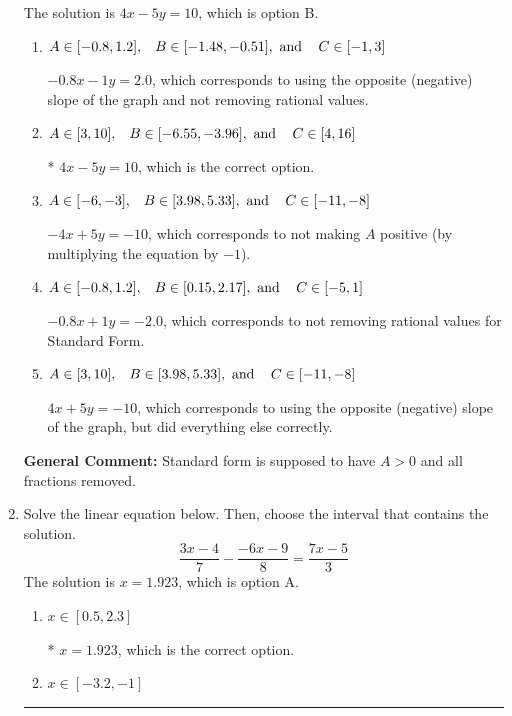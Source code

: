 \documentclass{extbook}[14pt]
\newcommand{\litem}[1]{\item #1

\rule{\textwidth}{0.4pt}}
\begin{document}
\begin{enumerate}
{The solution is \( 4x - 5y = 10 \), which is option B.\begin{enumerate}[label=\Alph*.]
\item \( A \in [-0.8, 1.2], \hspace{3mm} B \in [-1.48, -0.51], \text{ and } \hspace{3mm} C \in [-1, 3] \)

 $-0.8x - 1y = 2.0$, which corresponds to using the opposite (negative) slope of the graph and not removing rational values.
\item \( A \in [3, 10], \hspace{3mm} B \in [-6.55, -3.96], \text{ and } \hspace{3mm} C \in [4, 16] \)

* $4x - 5y = 10$, which is the correct option.
\item \( A \in [-6, -3], \hspace{3mm} B \in [3.98, 5.33], \text{ and } \hspace{3mm} C \in [-11, -8] \)

 $-4x + 5y = -10$, which corresponds to not making $A$ positive (by multiplying the equation by $-1$).
\item \( A \in [-0.8, 1.2], \hspace{3mm} B \in [0.15, 2.17], \text{ and } \hspace{3mm} C \in [-5, 1] \)

 $-0.8x + 1y = -2.0$, which corresponds to not removing rational values for Standard Form.
\item \( A \in [3, 10], \hspace{3mm} B \in [3.98, 5.33], \text{ and } \hspace{3mm} C \in [-11, -8] \)

 $4x + 5y = -10$, which corresponds to using the opposite (negative) slope of the graph, but did everything else correctly.
\end{enumerate}

\textbf{General Comment:} Standard form is supposed to have $A > 0$ and all fractions removed.
}
\litem{
Solve the linear equation below. Then, choose the interval that contains the solution.
\[ \frac{3x -4}{7} - \frac{-6x -9}{8} = \frac{7x -5}{3} \]
The solution is \( x = 1.923 \), which is option A.\begin{enumerate}[label=\Alph*.]
\item \( x \in [0.5, 2.3] \)

* $x = 1.923$, which is the correct option.
\item \( x \in [-3.2, -1] \)


\end{enumerate}}
\end{enumerate}
\end{document}
